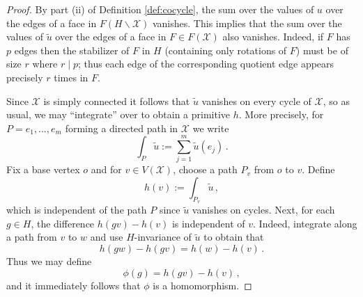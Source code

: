 \documentclass[11pt]{article}
\theoremstyle{remark}
\newcommand{\cX}{\mathcal X}
\begin{document}
\begin{proof} By part (ii) of Definition  \ref{def:cocycle}, the sum over the values of $u$ over the edges of a face in $F(H\backslash \cX)$ vanishes. This implies that the sum over the values of $\tilde u$ over the edges of a face in $F\in F(\cX)$ also vanishes. Indeed, if $F$ has $p$ edges then the stabilizer of $F$ in $H$ (containing only rotations of $F$) must be of size $r$ where $r \mid p$; thus each edge of the corresponding quotient edge appears precisely $r$ times in $F$.

Since $\cX$ is simply connected it follows that $\tilde{u}$ vanishes on every cycle of $\cX$, so as usual, we may ``integrate'' over to obtain a primitive $h$. More precisely, for $P=e_1,\ldots,e_m$ forming a directed path in $\cX$ we write
\[
\int_P \tilde{u} :=\sum_{j=1}^m \tilde{u}(e_j) \, .
\]
Fix a base vertex $o$ and for $v\in V(\cX)$, choose a path $P_v$ from $o$ to $v$. Define
\[
h(v) :=\int_{P_v} \tilde{u} \, ,
\]
which is independent of the path $P$ since $\tilde{u}$ vanishes on cycles.
Next, for each $g\in H$, the difference $h(gv)-h(v)$ is independent of $v$. Indeed, integrate along a path from $v$ to $w$ and use $H$-invariance of $\tilde{u}$ to obtain that
\[
h(gw)-h(gv)=h(w)-h(v) \, .
\]
Thus we may define
\[
\phi(g)=h(gv)-h(v) \, ,
\]
and it immediately follows that $\phi$ is a homomorphism. 
\end{proof}
\end{document}

